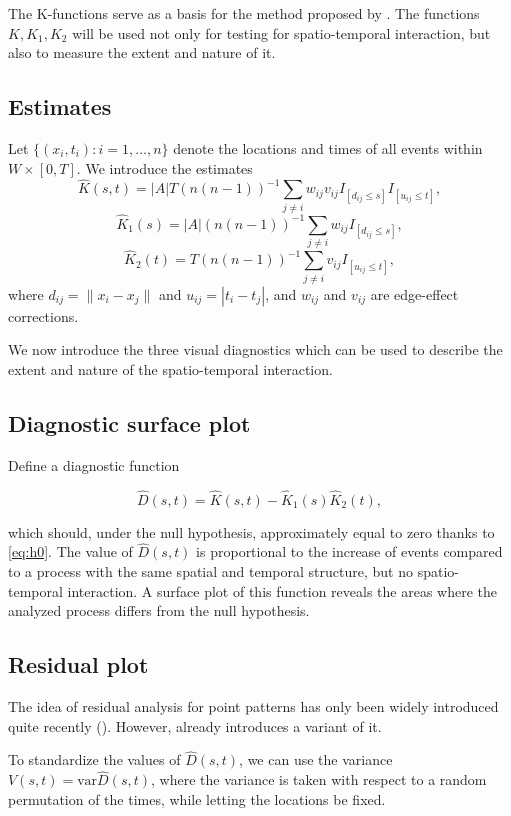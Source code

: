 \documentclass{article}
\begin{document}
The K-functions serve as a basis for the method proposed by \cite{diggle1995}. The functions $K,K_1,K_2$ will be used not only for testing for spatio-temporal interaction, but also to measure the extent and nature of it.

\subsection{Estimates}

Let $\{(x_i,t_i): i=1,\dots, n\}$ denote the locations and times of all events within $W\times [0,T]$. We introduce the estimates
$$\hat K(s,t) = |A|T (n(n-1))^{-1} \sum_{j\neq i} w_{ij} v_{ij} I_{[d_{ij} \leq s]} I_{[u_{ij} \leq t]},$$	
$$\hat K_1(s) = |A| (n(n-1))^{-1} \sum_{j\neq i} w_{ij}  I_{[d_{ij} \leq s]},$$	
$$\hat K_2(t) = T (n(n-1))^{-1} \sum_{j\neq i}  v_{ij}  I_{[u_{ij} \leq t]},$$
where $d_{ij} = \|x_i - x_j\|$ and $u_{ij} = |t_i - t_j|$, and $w_{ij}$ and $v_{ij}$ are edge-effect corrections.


We now introduce the three visual diagnostics which can be used to describe the extent and nature of the spatio-temporal interaction.

\subsection{Diagnostic surface plot}
Define a diagnostic function

$$\hat D(s,t) = \hat K(s,t) - \hat K_1(s) \hat K_2(t),$$

which should, under the null hypothesis, approximately equal to zero thanks to \eqref{eq:h0}. The value of $\hat D(s,t)$ is proportional to the increase of events compared to a process with the same spatial and temporal structure, but no spatio-temporal interaction. A surface plot of this function reveals the areas where the analyzed process differs from the null hypothesis.




\subsection{Residual plot}
The idea of residual analysis for point patterns has only been widely introduced quite recently (\cite{Baddeley2005}). However, \cite{diggle1995} already introduces a variant of it. 

To standardize the values of $\hat D(s,t)$, we can use the variance $V(s,t) = \mathrm{var} \hat D(s,t)$, where the variance is taken with respect to a random permutation of the times, while letting the locations be fixed. 
\end{document}
